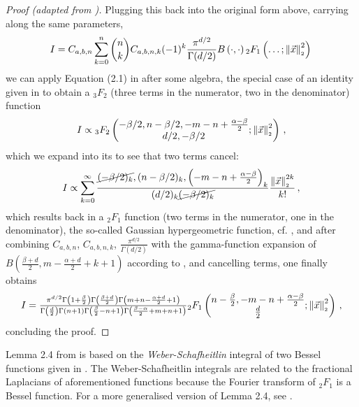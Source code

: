 \begin{proof}[Proof (adapted from \cite{2021-arbitrary-dimensions})]
  Plugging this back into the original form above, carrying along the same parameters,
  \begin{align*}
    I = C_{a,b,n} \sum_{k=0}^n \binom{n}{k} C_{a,b,n,k} (-1)^k \frac{\pi^{d/2}}{\Gamma(d/2)} B\left(\cdot, \cdot\right) {}_2F_1\left(\dots; \left\lVert\vec{x}\right\rVert_{\scriptscriptstyle 2}^2\right)\,
  \end{align*}
  we can apply Equation (2.1) in \cite{2021-arbitrary-dimensions} after some algebra, the special case of an identity given in \cite{1986-crazy-hypergeometric-properties} to obtain a ${}_3F_2$ (three terms in the numerator, two in the denominator) function
  \begin{align*}
    I \propto {}_3F_2\left(\begin{matrix}-\beta/2, n-\beta/2, -m-n+\frac{\alpha-\beta}{2} \\d/2, -\beta/2\end{matrix}; \left\lVert\vec{x}\right\rVert_{\scriptscriptstyle 2}^2\right)\,,
  \end{align*}
  which we expand into its  to see that two terms cancel:
  \begin{align*}
    I \propto \sum_{k=0}^{\infty} \frac{\cancel{(-\beta/2)_k}, (n-\beta/2)_k, \left(-m-n+\frac{\alpha-\beta}{2}\right)_k}{(d/2)_k \cancel{(-\beta/2)_k}} \frac{\left\lVert\vec{x}\right\rVert_{\scriptscriptstyle 2}^{2k}}{k!}\,,
  \end{align*}
  which results back in a ${}_2F_1$ function (two terms in the numerator, one in the denominator), the so-called Gaussian hypergeometric function, cf. , and after combining $C_{a,b,n}$, $C_{a,b,n,k}$, $\frac{\pi^{d/2}}{\Gamma(d/2)}$ with the gamma-function expansion of $B\left(\tfrac{\beta+d}{2}, m-\tfrac{\alpha+d}{2}+k+1\right)$ according to , and cancelling terms, one finally obtains
  $$I = \tfrac{\pi^{d/2} \Gamma \left(1+\frac{\beta}{2}\right) \Gamma \left(\frac{\beta+d}{2}\right) \Gamma \left(m+n-\frac{\alpha+d}{2}+1\right)}{\Gamma \left(\frac{d}{2}\right) \Gamma (n+1) \Gamma \left(\frac{\beta}{2}-n+1\right) \Gamma \left(\frac{\beta-\alpha}{2}+m+n+1\right)}{}_2F_1\left(\begin{matrix}n-\frac{\beta}{2}, -m-n+\frac{\alpha-\beta}{2} \\\frac{d}{2}\end{matrix};\left\lVert\vec{x}\right\rVert_{\scriptscriptstyle 2}^2\right)\,,$$
  concluding the proof.
\end{proof}

Lemma 2.4 from \cite{2011-porous-medium-1,1967-formulas-and-theorems} is based on the \textit{Weber-Schafheitlin} integral of two Bessel functions given in \cite{1945-bessel-integral}.
The Weber-Schafheitlin integrals are related to the fractional Laplacians of aforementioned functions because the Fourier transform of ${}_2F_1$ is a Bessel function.
For a more generalised version of Lemma 2.4, see \cite{2014-barenblatt}.

